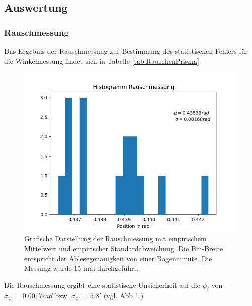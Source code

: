 \documentclass[12pt,a4paper]{article}
\begin{document}
	
	\subsection{Auswertung}
	
	\subsubsection{Rauschmessung}
	
	Das Ergebnis der Rauschmessung zur Bestimmung des statistischen Fehlers für die Winkelmessung findet sich in Tabelle \ref{tab:RauschenPrisma}.
	
	\begin{figure}
		\includegraphics[scale=1.0]{Bilder/HistRauschen.png}
		\caption{Grafische Darstellung der Rauschmessung mit empirischem Mittelwert und empirischer Standardabweichung. Die Bin-Breite entspricht der Ablesegenauigkeit von einer Bogenminute. Die Messung wurde 15 mal durchgeführt.}
		\label{fig:HistRauschen}
	\end{figure}
	
	Die Rauschmessung ergibt eine statistische Unsicherheit auf die $\psi_i$ von $\sigma_{\psi_i} = 0.0017 rad$ bzw. $\sigma_{\psi_i} = 5.8'$ (vgl. Abb \ref{fig:HistRauschen}.)
	
\end{document}
